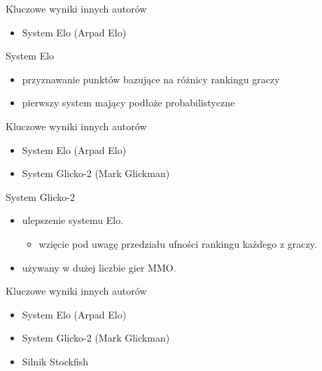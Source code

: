 \documentclass{beamer}
\begin{document}
\begin{frame}{Kluczowe wyniki innych autorów}
	\begin{itemize}
		\item System Elo \cite{elo} (Arpad Elo)
	\end{itemize}
\end{frame}

\begin{frame}{System Elo}
	\begin{itemize}
		\item przyznawanie punktów bazujące na różnicy rankingu graczy
		\item pierwszy system mający podłoże probabilistyczne
	\end{itemize}
\end{frame}

\begin{frame}{Kluczowe wyniki innych autorów}
	\begin{itemize}
		\item System Elo \cite{elo} (Arpad Elo)
		\item System Glicko-2 \cite{glicko}  (Mark Glickman)
	\end{itemize}
\end{frame}

\begin{frame}{System Glicko-2}
	\begin{itemize}
		\item ulepszenie systemu Elo.
		\begin{itemize}
			\item wzięcie pod uwagę przedziału ufności rankingu każdego z graczy.
		\end{itemize}
		\item używany w dużej liczbie gier MMO.
	\end{itemize}
\end{frame}

\begin{frame}{Kluczowe wyniki innych autorów}
	\begin{itemize}
		\item System Elo \cite{elo} (Arpad Elo)
		\item System Glicko-2 \cite{glicko} (Mark Glickman)
		\item Silnik Stockfish \cite{stockfish}
	\end{itemize}
\end{frame}
\end{document}
